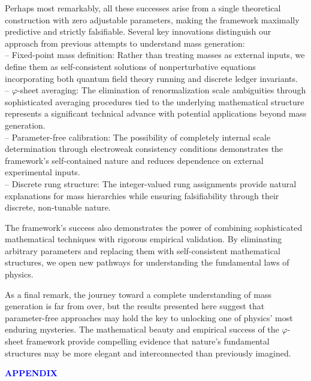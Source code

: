 \documentclass[%
amsmath,amssymb,
aps,
prb,
floatfix, showkeys, 10pt,
]{revtex4-2}
\newcommand{\modif}[1]{\textcolor{blue}{#1}}
\begin{document}
Perhaps most remarkably, all these successes arise from a single theoretical construction with zero adjustable parameters, making the framework maximally predictive and strictly falsifiable. 
Several key innovations distinguish our approach from previous attempts to understand mass generation: \\
-- Fixed-point mass definition: Rather than treating masses as external inputs, we define them as self-consistent solutions of nonperturbative equations incorporating both quantum field theory running and discrete ledger invariants. \\
-- $\varphi$-sheet averaging: The elimination of renormalization scale ambiguities through sophisticated averaging procedures tied to the underlying mathematical structure represents a significant technical advance with potential applications beyond mass generation. \\
-- Parameter-free calibration: The possibility of completely internal scale determination through electroweak consistency conditions demonstrates the framework's self-contained nature and reduces dependence on external experimental inputs. \\
-- Discrete rung structure: The integer-valued rung assignments provide natural explanations for mass hierarchies while ensuring falsifiability through their discrete, non-tunable nature.




The framework's success also demonstrates the power of combining sophisticated mathematical techniques with rigorous empirical validation. By eliminating arbitrary parameters and replacing them with self-consistent mathematical structures, we open new pathways for understanding the fundamental laws of physics.

As a final remark, the journey toward a complete understanding of mass generation is far from over, but the results presented here suggest that parameter-free approaches may hold the key to unlocking one of physics' most enduring mysteries. The mathematical beauty and empirical success of the $\varphi$-sheet framework provide compelling evidence that nature's fundamental structures may be more elegant and interconnected than previously imagined.


{\modif{ \begin{center}  \vspace{0.51cm}  {\bf APPENDIX} \vspace{-0.51cm}  \end{center}   }}
\end{document}
